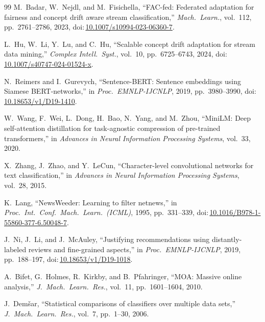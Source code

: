\documentclass[conference]{IEEEtran}
\newcommand{\doi}[1]{doi:\,\url{#1}}
\begin{document}
\begin{thebibliography}{99}
 M.~Badar, W.~Nejdl, and M.~Fisichella, ``FAC-fed: Federated adaptation for fairness and concept drift aware stream classification,'' \emph{Mach.\ Learn.}, vol.~112, pp.~2761--2786, 2023, \doi{10.1007/s10994-023-06360-7}.

 L.~Hu, W.~Li, Y.~Lu, and C.~Hu, ``Scalable concept drift adaptation for stream data mining,'' \emph{Complex Intell.\ Syst.}, vol.~10, pp.~6725--6743, 2024, \doi{10.1007/s40747-024-01524-x}.

 N.~Reimers and I.~Gurevych, ``Sentence-BERT: Sentence embeddings using Siamese BERT-networks,'' in \emph{Proc.\ EMNLP-IJCNLP}, 2019, pp.~3980--3990, \doi{10.18653/v1/D19-1410}.

 W.~Wang, F.~Wei, L.~Dong, H.~Bao, N.~Yang, and M.~Zhou, ``MiniLM: Deep self-attention distillation for task-agnostic compression of pre-trained transformers,'' in \emph{Advances in Neural Information Processing Systems}, vol.~33, 2020.

 X.~Zhang, J.~Zhao, and Y.~LeCun, ``Character-level convolutional networks for text classification,'' in \emph{Advances in Neural Information Processing Systems}, vol.~28, 2015.

 K.~Lang, ``NewsWeeder: Learning to filter netnews,'' in \emph{Proc.\ Int.\ Conf.\ Mach.\ Learn.\ (ICML)}, 1995, pp.~331--339, \doi{10.1016/B978-1-55860-377-6.50048-7}.

 J.~Ni, J.~Li, and J.~McAuley, ``Justifying recommendations using distantly-labeled reviews and fine-grained aspects,'' in \emph{Proc.\ EMNLP-IJCNLP}, 2019, pp.~188--197, \doi{10.18653/v1/D19-1018}.

 A.~Bifet, G.~Holmes, R.~Kirkby, and B.~Pfahringer, ``MOA: Massive online analysis,'' \emph{J.\ Mach.\ Learn.\ Res.}, vol.~11, pp.~1601--1604, 2010.

 J.~Dem\v{s}ar, ``Statistical comparisons of classifiers over multiple data sets,'' \emph{J.\ Mach.\ Learn.\ Res.}, vol.~7, pp.~1--30, 2006.
\end{thebibliography}
\end{document}
